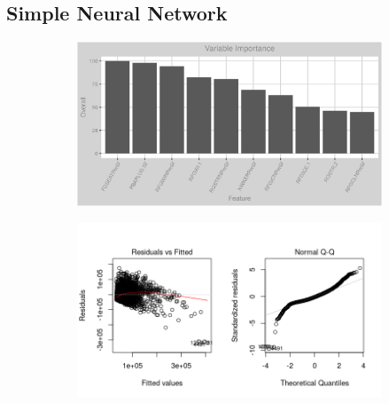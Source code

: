 \subsection{Simple Neural Network}
\label{appendix:electricity:snn}
\begin{figure}[h]
\centering
\begin{subfigure}{1\textwidth}
\centering
\includegraphics[width=.99\textwidth, height=0.35\textheight]{Images/electricity_psf_nn_vars.png}
\end{subfigure}
\begin{subfigure}{1\textwidth}
\centering
\includegraphics[width=.99\textwidth, height=0.4\textheight]{Images/electricity_psf_nn_res_1.png}
\end{subfigure}
\end{figure}
\FloatBarrier
\newpage
